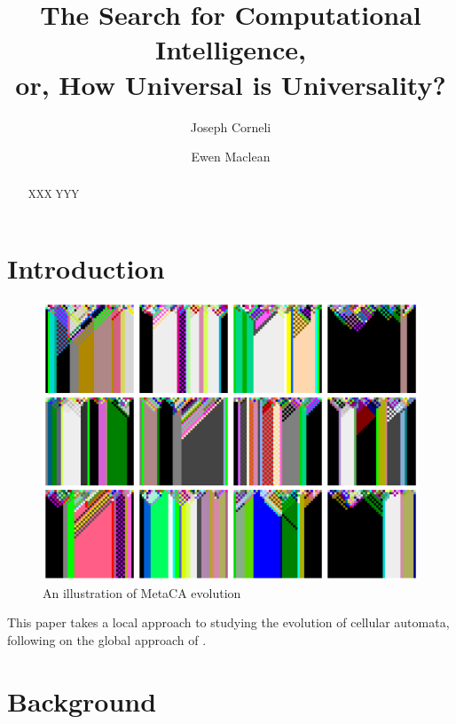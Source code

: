 \documentclass{AISB2008}
\begin{document}
\title{The Search for Computational Intelligence,\\ or, How Universal is Universality?}

\author{Joseph Corneli \and Ewen Maclean }

\maketitle


\begin{abstract}
XXX YYY
\end{abstract}

\section{Introduction}

\begin{figure}
\includegraphics[width=\columnwidth]{metaca.png}
\caption{An illustration of MetaCA evolution}
\end{figure}

This paper takes a local approach to studying the
evolution of cellular automata, following on the
global approach of \cite{pavlic2014self}.

\newpage

\section{Background}
\end{document}
